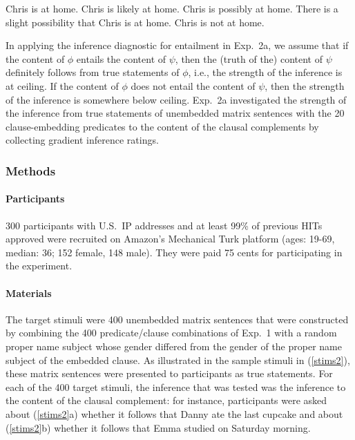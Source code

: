 \documentclass[11pt,fleqn]{article}
\newcommand{\6}{\mbox{$[\hspace*{-.6mm}[$}}
\newcommand{\9}{\mbox{$]\hspace*{-.6mm}]$}}
\begin{document}
\begin{exe}
\ex\label{chris}
\begin{xlist}
 Chris is at home.
 Chris is likely at home.
 Chris is possibly at home.
 There is a slight possibility that Chris is at home.
 Chris is not at home.
\end{xlist}
\end{exe}

In applying the inference diagnostic for entailment in Exp.~2a, we assume that if the content of $\phi$ entails the content of $\psi$, then the (truth of the) content of $\psi$ definitely follows from true statements of $\phi$, i.e., the strength of the inference is at ceiling. If the content of $\phi$ does not entail the content of $\psi$, then the strength of the inference is somewhere below ceiling. Exp.~2a investigated the strength of the inference from true statements of unembedded matrix sentences with the 20 clause-embedding predicates to the content of the clausal complements by collecting gradient inference ratings.

\subsubsection{Methods}

\paragraph{Participants} 300 participants with U.S.\ IP addresses and at least 99\% of previous HITs approved were recruited on Amazon's Mechanical Turk platform (ages: 19-69, median: 36; 152 female, 148 male). They were paid 75 cents for participating in the experiment.

\paragraph{Materials} The target stimuli were 400 unembedded matrix sentences that were constructed by combining the 400 predicate/clause combinations of Exp.~1 with a random proper name subject whose gender differed from the gender of the proper name subject of the embedded clause. As illustrated in the sample stimuli in (\ref{stims2}), these matrix sentences were presented to participants as true statements. For each of the 400 target stimuli, the inference that was tested was the inference to the content of the clausal complement: for instance, participants were asked about (\ref{stims2}a) whether it follows that Danny ate the last cupcake and about (\ref{stims2}b) whether it follows that Emma studied on Saturday morning.
\end{document}
